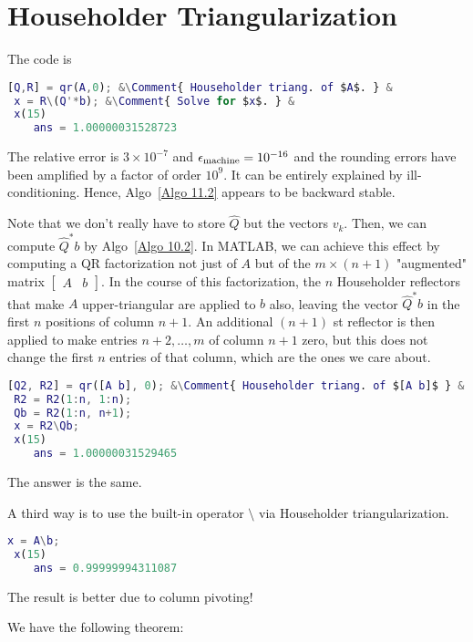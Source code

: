 \newpage
\section{Householder Triangularization} 
The code is 
\begin{lstlisting}[language=Matlab ]
 [Q,R] = qr(A,0); &\Comment{ Householder triang. of $A$. } &
 x = R\(Q'*b); &\Comment{ Solve for $x$. } &
 x(15)
    ans = 1.00000031528723
\end{lstlisting}
The relative error is $3\times 10^{-7}$ and $\epsilon_{\text{machine}} = 10^{-16}$ and the rounding errors have been amplified by a factor of order $10^9$. It can be entirely explained by ill-conditioning. Hence, Algo~\ref{Algo 11.2} appears to be backward stable.  

Note that we don't really have to store $\hat Q$ but the vectors $v_k$. Then, we can compute $\hat Q^*b$ by Algo~\ref{Algo 10.2}. In MATLAB, we can achieve this effect by computing a QR factorization not just of $A$ but of the $m \times(n+1)$ "augmented" matrix $\left[\begin{array}{ll}A & b\end{array}\right]$. In the course of this factorization, the $n$ Householder reflectors that make $A$ upper-triangular are applied to $b$ also, leaving the vector $\hat{Q}^* b$ in the first $n$ positions of column $n+1$. An additional $(n+1)$ st reflector is then applied to make entries $n+2, \ldots, m$ of column $n+1$ zero, but this does not change the first $n$ entries of that column, which are the ones we care about.

\begin{lstlisting}[language=Matlab]
 [Q2, R2] = qr([A b], 0); &\Comment{ Householder triang. of $[A b]$ } &
 R2 = R2(1:n, 1:n);
 Qb = R2(1:n, n+1);
 x = R2\Qb;
 x(15)
    ans = 1.00000031529465
\end{lstlisting}
The answer is the same.  

A third way is to use the built-in operator $ \setminus$ via Householder triangularization.

\begin{lstlisting}[language=Matlab ]
 x = A\b;
 x(15)
    ans = 0.99999994311087
\end{lstlisting}
The result is better due to column pivoting! 

We have the following theorem: 

